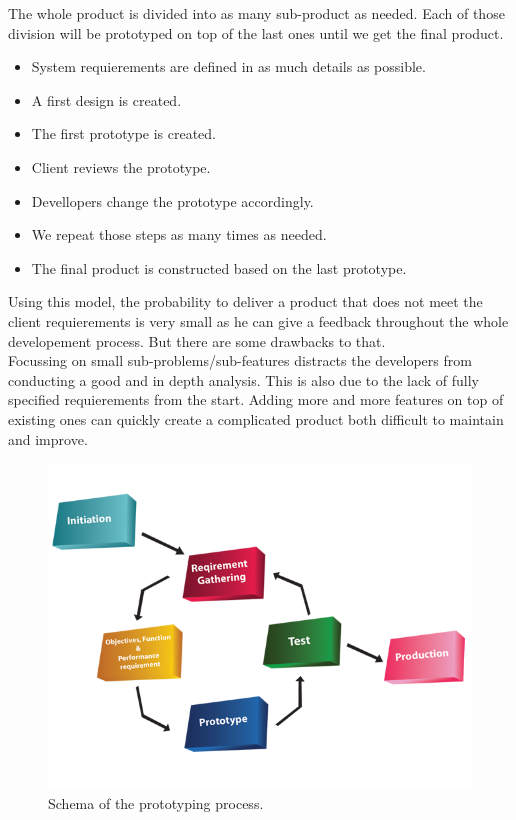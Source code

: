 \documentclass[12pt]{article}
\begin{document}
The whole product is divided into as many sub-product as needed. Each of those division will be prototyped on top of the last ones until we get the final product.\\

\begin{itemize}

\item System requierements are defined in as much details as possible.
\item A first design is created.
\item The first prototype is created.
\item Client reviews the prototype.
\item Devellopers change the prototype accordingly.
\item We repeat those steps as many times as needed.
\item The final product is constructed based on the last prototype.

\end{itemize}

Using this model, the probability to deliver a product that does not meet the client requierements is very small as he can give a feedback throughout the whole developement process. But there are some drawbacks to that.\\

Focussing on small sub-problems/sub-features distracts the developers from conducting a good and in depth analysis. This is also due to the lack of fully specified requierements from the start. Adding more and more features on top of existing ones can quickly create a complicated product both difficult to maintain and improve.\\

\begin{figure}
    \centering
    \includegraphics[scale=0.4]{prototyping.png}
    \caption{Schema of the prototyping process.}
    \label{Prototyping}
\end{figure}
\end{document}
